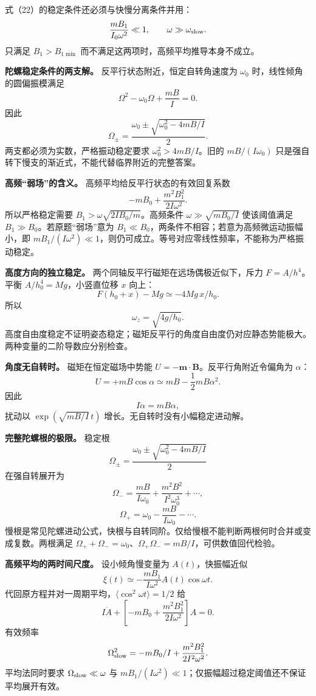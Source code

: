 \documentclass[12pt,a4paper,UTF8]{ctexart}
\begin{document}
式（22）的稳定条件还必须与快慢分离条件并用： \[
\frac{mB_1}{I_0\omega^2}\ll1,
\qquad
\omega\gg\omega_{\rm slow}.
\] 只满足 \(B_1>B_{1\min}\) 而不满足这两项时，高频平均推导本身不成立。

\textbf{陀螺稳定条件的两支解。} 反平行状态附近，恒定自转角速度为
\(\omega_0\) 时，线性倾角的圆偏振模满足 \[
\Omega^2-\omega_0\Omega+\frac{mB}{I}=0.
\] 因此 \[
\boxed{\Omega_\pm=\frac{\omega_0\pm\sqrt{\omega_0^2-4mB/I}}2}.
\] 两支都必须为实数，严格振动稳定要求 \(\omega_0^2>4mB/I\)。旧的
\(mB/(I\omega_0)\)
只是强自转下慢支的渐近式，不能代替临界附近的完整答案。

\textbf{高频``弱场''的含义。} 高频平均给反平行状态的有效回复系数 \[
-mB_0+\frac{m^2B_1^2}{2I\omega^2}.
\] 所以严格稳定需要 \(B_1>\omega\sqrt{2IB_0/m}\)。高频条件
\(\omega\gg\sqrt{mB_0/I}\) 使该阈值满足
\(B_1\gg B_0\)。若原题``弱场''意为
\(B_1\ll B_0\)，两条件不相容；若意为高频微运动振幅小，即
\(mB_1/(I\omega^2)\ll1\)，则仍可成立。等号对应零线性频率，不能称为严格振动稳定。

\textbf{高度方向的独立稳定。} 两个同轴反平行磁矩在远场偶极近似下，斥力
\(F=A/h^4\)。平衡 \(A/h_0^4=Mg\)，小竖直位移 \(x\) 向上： \[
F(h_0+x)-Mg\simeq-4Mg\,x/h_0.
\] 所以 \[
\boxed{\omega_z=\sqrt{4g/h_0}}.
\]
高度自由度稳定不证明姿态稳定；磁矩反平行的角度自由度仍对应静态势能极大。两种变量的二阶导数应分别检查。

\textbf{角度无自转时。} 磁矩在恒定磁场中势能
\(U=-\boldsymbol m\cdot\boldsymbol B\)。反平行角附近令偏角为
\(\alpha\)： \[
U=+mB\cos\alpha\simeq mB-\frac12mB\alpha^2.
\] 因此 \[
I\ddot\alpha=mB\alpha,
\] 扰动以 \(\exp(\sqrt{mB/I}\,t)\) 增长。无自转时没有小幅稳定进动解。

\textbf{完整陀螺根的极限。} 稳定根 \[
\Omega_\pm=\frac{\omega_0\pm\sqrt{\omega_0^2-4mB/I}}2
\] 在强自转展开为 \[
\Omega_-=\frac{mB}{I\omega_0}
+\frac{m^2B^2}{I^2\omega_0^3}+\cdots,
\] \[
\Omega_+=\omega_0-\frac{mB}{I\omega_0}-\cdots.
\]
慢根是常见陀螺进动公式，快根与自转同阶。仅给慢根不能判断两根何时合并或变成复数。两根满足
\(\Omega_++\Omega_-=\omega_0\)、\(\Omega_+\Omega_-=mB/I\)，可供数值回代检验。

\textbf{高频平均的两时间尺度。} 设小倾角慢变量为 \(A(t)\)，快振幅近似 \[
\xi(t)\simeq-\frac{mB_1}{I\omega^2}A(t)\cos\omega t.
\] 代回原方程并对一周期平均，\(\langle\cos^2\omega t\rangle=1/2\) 给 \[
I\ddot A+
\left[-mB_0+\frac{m^2B_1^2}{2I\omega^2}\right]A=0.
\] 有效频率 \[
\Omega_{\rm slow}^2=
-mB_0/I+\frac{m^2B_1^2}{2I^2\omega^2}.
\] 平均法同时要求 \(\Omega_{\rm slow}\ll\omega\) 与
\(mB_1/(I\omega^2)\ll1\)；仅振幅超过稳定阈值还不保证平均展开有效。
\end{document}
